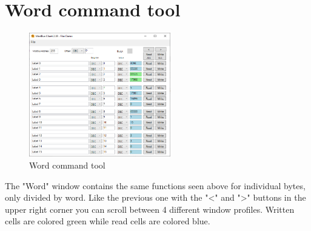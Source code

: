 \section{Word command tool}

\begin{figure}[H]
\centering
\includegraphics[width=0.55\textwidth]{../Img/Tool_Command_Word.PNG}
\caption{Word command tool}
\end{figure}

The "Word" window contains the same functions seen above for individual bytes, only
divided by word. Like the previous one with the "<" and ">" buttons in the upper right corner you can
scroll between 4 different window profiles.
Written cells are colored green while read cells are colored blue.
